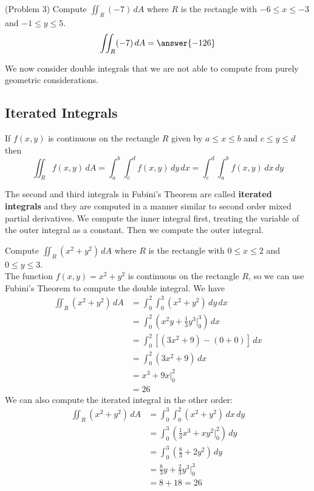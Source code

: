 \documentclass[handout]{ximera}
\begin{document}
\begin{problem}(Problem 3)
Compute $\iint_R (-7) \, dA$ where $R$ is the rectangle with $-6 \leq x \leq -3$ and $-1 \leq y \leq 5$.\\
\[
\iint_R (-7) \, dA = \answer{-126}
\]
\end{problem}

We now consider double integrals that we are not able to compute from purely geometric considerations.

\subsection{Iterated Integrals}

\begin{theorem}
If $f(x,y)$ is continuous on the rectangle $R$ given by $a \leq x \leq b$ and $c \leq y \leq d$
then
\[
\iint_R f(x,y) \, dA = \int_a^b \int_c^d f(x,y) \, dy\, dx = \int_c^d \int_a^b f(x,y) \, dx \, dy
\]
\end{theorem}

\begin{remark} The second and third integrals in Fubini's Theorem are called \textbf{iterated integrals}
and they are computed in a manner similar to second order mixed partial derivatives. We compute the inner integral first, treating the 
variable of the outer integral as a constant.  Then we compute the outer integral.
\end{remark}

\begin{example}[Example 4]
Compute $\iint_R (x^2 + y^2) \, dA$ where $R$ is the rectangle with $0 \leq x \leq 2$ and $0 \leq y \leq 3$.\\
The function $f(x,y) = x^2 + y^2$ is continuous on the rectangle $R$, so we can use Fubini's Theorem to compute the double integral.
We have
\begin{align*}
\iint_R (x^2 + y^2) \, dA &= \int_0^2 \int_0^3 (x^2 + y^2) \, dy\, dx\\
                          &= \int_0^2 \left(x^2 y + \frac13 y^3 \bigg|_0^3 \right) \, dx\\
                          &= \int_0^2 \left[(3x^2 + 9) - (0+0) \right] \, dx\\
                          &= \int_0^2 (3x^2 + 9) \, dx\\
                          &= x^3 + 9x \bigg|_0^2\\
                          &= 26
\end{align*}
We can also compute the iterated integral in the other order:
\begin{align*}
\iint_R (x^2 + y^2) \, dA &= \int_0^3 \int_0^2 (x^2 + y^2) \, dx\, dy\\
                          &= \int_0^3 \left( \frac13 x^3 + xy^2 \bigg|_0^2 \right) \, dy\\
                          &= \int_0^3 \left(\frac83 + 2y^2 \right) \, dy\\
                          &= \frac83 y + \frac23 y^3 \bigg|_0^3\\
                          &= 8 + 18 = 26
\end{align*}
\end{example}
\end{document}
